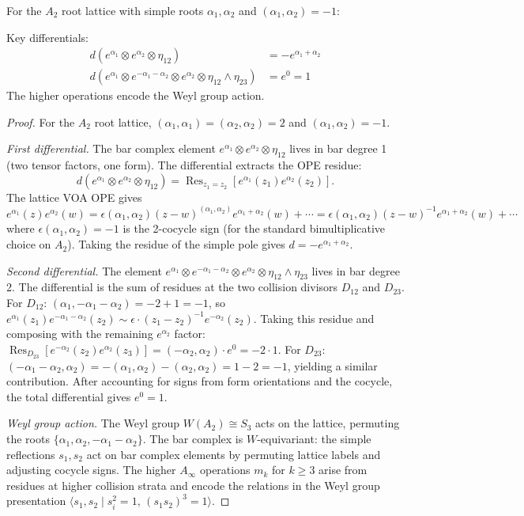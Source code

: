 For the $A_2$ root lattice with simple roots $\alpha_1, \alpha_2$ and $(\alpha_1, \alpha_2) = -1$:
 
\begin{proposition}\label{prop:A2-lattice-bar}
Key differentials:
\begin{align}
d(e^{\alpha_1} \otimes e^{\alpha_2} \otimes \eta_{12}) &= -e^{\alpha_1+\alpha_2} \\
d(e^{\alpha_1} \otimes e^{-\alpha_1-\alpha_2} \otimes e^{\alpha_2} \otimes \eta_{12} \wedge \eta_{23}) &= e^0 = 1
\end{align}
The higher operations encode the Weyl group action.
\end{proposition}

\begin{proof}
For the $A_2$ root lattice, $(\alpha_1, \alpha_1) = (\alpha_2, \alpha_2) = 2$ and $(\alpha_1, \alpha_2) = -1$.

\emph{First differential.}
The bar complex element $e^{\alpha_1} \otimes e^{\alpha_2} \otimes \eta_{12}$ lives in bar degree 1 (two tensor factors, one form).  The differential extracts the OPE residue:
\[
d(e^{\alpha_1} \otimes e^{\alpha_2} \otimes \eta_{12}) = \operatorname{Res}_{z_1 = z_2}\left[e^{\alpha_1}(z_1) e^{\alpha_2}(z_2)\right].
\]
The lattice VOA OPE gives $e^{\alpha_1}(z) e^{\alpha_2}(w) = \epsilon(\alpha_1, \alpha_2)(z-w)^{(\alpha_1,\alpha_2)} e^{\alpha_1+\alpha_2}(w) + \cdots = \epsilon(\alpha_1, \alpha_2)(z-w)^{-1} e^{\alpha_1+\alpha_2}(w) + \cdots$ where $\epsilon(\alpha_1, \alpha_2) = -1$ is the 2-cocycle sign (for the standard bimultiplicative choice on $A_2$).  Taking the residue of the simple pole gives $d = -e^{\alpha_1 + \alpha_2}$.

\emph{Second differential.}
The element $e^{\alpha_1} \otimes e^{-\alpha_1-\alpha_2} \otimes e^{\alpha_2} \otimes \eta_{12} \wedge \eta_{23}$ lives in bar degree 2.  The differential is the sum of residues at the two collision divisors $D_{12}$ and $D_{23}$.  For $D_{12}$: $(\alpha_1, -\alpha_1 - \alpha_2) = -2 + 1 = -1$, so $e^{\alpha_1}(z_1) e^{-\alpha_1-\alpha_2}(z_2) \sim \epsilon \cdot (z_1-z_2)^{-1} e^{-\alpha_2}(z_2)$.  Taking this residue and composing with the remaining $e^{\alpha_2}$ factor: $\operatorname{Res}_{D_{23}}[e^{-\alpha_2}(z_2) e^{\alpha_2}(z_3)] = (-\alpha_2, \alpha_2) \cdot e^0 = -2 \cdot 1$.  For $D_{23}$: $(-\alpha_1-\alpha_2, \alpha_2) = -(\alpha_1,\alpha_2) - (\alpha_2,\alpha_2) = 1-2 = -1$, yielding a similar contribution.  After accounting for signs from form orientations and the cocycle, the total differential gives $e^0 = 1$.

\emph{Weyl group action.}
The Weyl group $W(A_2) \cong S_3$ acts on the lattice, permuting the roots $\{\alpha_1, \alpha_2, -\alpha_1-\alpha_2\}$.  The bar complex is $W$-equivariant: the simple reflections $s_1, s_2$ act on bar complex elements by permuting lattice labels and adjusting cocycle signs.  The higher $A_\infty$ operations $m_k$ for $k \geq 3$ arise from residues at higher collision strata and encode the relations in the Weyl group presentation $\langle s_1, s_2 \mid s_i^2 = 1,\, (s_1 s_2)^3 = 1 \rangle$.
\end{proof}
 
